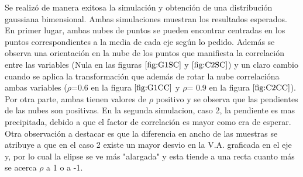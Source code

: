 Se realizó de manera exitosa la simulación y obtención de una distribución gaussiana bimensional. Ambas simulaciones muestran los resultados esperados. En primer lugar, ambas nubes de puntos se pueden encontrar centradas en los puntos correspondientes a la media de cada eje según lo pedido.
Además se observa una orientación en la nube de los puntos que manifiesta la correlación entre las variables (Nula en las figuras $\ref{fig:G1SC}$ y $\ref{fig:C2SC}$) y un claro cambio cuando se aplica la transformación que además de rotar la nube correlacióna ambas variables ($\rho$=0.6 en la figura $\ref{fig:G1CC}$ y $\rho$= 0.9 en la figura $\ref{fig:C2CC}$).
Por otra parte, ambas tienen valores de $\rho$ positivo y se observa que las pendientes de las nubes son positivas. En la segunda simulacion, caso 2, la pendiente es mas precipitada, debido a que el factor de correlación es mayor como era de esperar.
Otra observación a destacar es que la diferencia en ancho de las muestras se atribuye a que en el caso 2 existe un mayor desvio en la V.A. graficada en el eje y, por lo cual la elipse se ve más "alargada" y esta tiende a una recta cuanto más se acerca $\rho$ a 1 o a -1.
